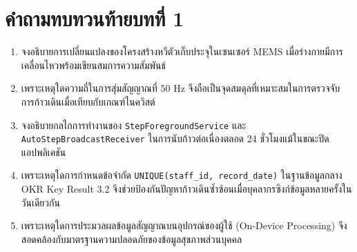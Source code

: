 \section*{คำถามทบทวนท้ายบทที่ 1}
\begin{enumerate}
    \item จงอธิบายการเปลี่ยนแปลงของโครงสร้างหวีตัวเก็บประจุในเซนเซอร์ MEMS เมื่อร่างกายมีการเคลื่อนไหวพร้อมเขียนสมการความสัมพันธ์
    \item เพราะเหตุใดความถี่ในการสุ่มสัญญาณที่ $50\text{ Hz}$ จึงถือเป็นจุดสมดุลที่เหมาะสมในการตรวจจับการก้าวเดินเมื่อเทียบกับเกณฑ์ไนควิสต์
    \item จงอธิบายกลไกการทำงานของ \texttt{StepForegroundService} และ \texttt{AutoStepBroadcastReceiver} ในการนับก้าวต่อเนื่องตลอด 24 ชั่วโมงแม้ในขณะปิดแอปพลิเคชัน
    \item เพราะเหตุใดการกำหนดข้อจำกัด \texttt{UNIQUE(staff\_id, record\_date)} ในฐานข้อมูลกลาง OKR Key Result 3.2 จึงช่วยป้องกันปัญหาก้าวเดินซ้ำซ้อนเมื่อบุคลากรซิงก์ข้อมูลหลายครั้งในวันเดียวกัน
    \item เพราะเหตุใดการประมวลผลข้อมูลสัญญาณบนอุปกรณ์ของผู้ใช้ (On-Device Processing) จึงสอดคล้องกับมาตรฐานความปลอดภัยของข้อมูลสุขภาพส่วนบุคคล
\end{enumerate}
\clearpage
